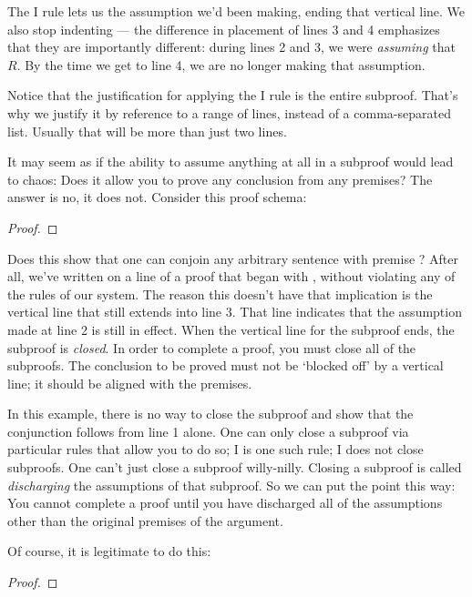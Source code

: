 The {\eif}I rule lets us  the assumption we'd been making, ending that vertical line. We also stop indenting --- the difference in placement of lines 3 and 4 emphasizes that they are importantly different: during lines 2 and 3, we were \emph{assuming} that \enot $R$. By the time we get to line 4, we are no longer making that assumption.

Notice that the justification for applying the {\eif}I rule is the entire subproof. That's why we justify it by reference to a range of lines, instead of a comma-separated list. Usually that will be more than just two lines.

It may seem as if the ability to assume anything at all in a subproof would lead to chaos: Does it allow you to prove any conclusion from any premises? The answer is no, it does not. Consider this proof schema:

\begin{proof}
	\metaA{}
	\open
		\metaB{}
		 
	\close
\end{proof}

Does this show that one can conjoin any arbitrary sentence \metaB{} with premise \metaA{}? After all, we've written \metaB{}\eand\metaA{} on a line of a proof that began with \metaA{}, without violating any of the rules of our system. The reason this doesn't have that implication is the vertical line that still extends into line 3. That line indicates that the assumption made at line 2 is still in effect. When the vertical line for the subproof ends, the subproof is \emph{closed}. In order to complete a proof, you must close all of the subproofs. The conclusion to be proved must not be `blocked off' by a vertical line; it should be aligned with the premises.

In this example, there is no way to close the subproof and show that the conjunction follows from line 1 alone. One can only close a subproof via particular rules that allow you to do so; {\eif}I is one such rule; {\eand}I does not close subproofs. One can't just close a subproof willy-nilly. Closing a subproof is called \emph{discharging} the assumptions of that subproof. So we can put the point this way: You cannot complete a proof until you have discharged all of the assumptions other than the original premises of the argument.

Of course, it is legitimate to do this:

\begin{proof}
	\metaA{}
	\open
		\metaB{}
		 
	\close
	 
\end{proof}

